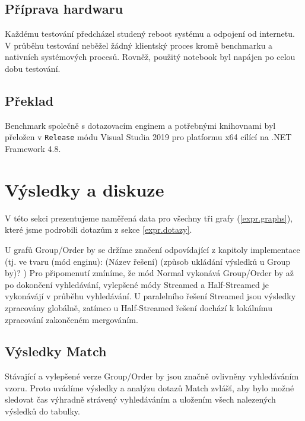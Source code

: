 \subsection{Příprava hardwaru}

Každému testování předcházel studený reboot systému a odpojení od internetu. 
V průběhu testování neběžel žádný klientský proces kromě benchmarku a nativních systémových procesů. 
Rovněž, použitý notebook byl napájen po celou dobu testování.


\subsection{Překlad}

Benchmark společně s dotazovacím enginem a potřebnými knihovnami byl přeložen v \verb+Release+ módu Visual Studia 2019 pro platformu x64 cílící na .NET Framework 4.8. 

\clearpage

\section{Výsledky a diskuze}

V této sekci prezentujeme naměřená data pro všechny tři grafy (\ref{expr.graphs}), které jsme podrobili dotazům z sekce \ref{expr.dotazy}.

U grafů Group/Order by se držíme značení odpovídající z kapitoly implementace (tj. ve tvaru (mód enginu): (Název řešení) (způsob ukládání výsledků u Group by)? )
Pro připomenutí zmíníme, že mód Normal vykonává Group/Order by až po dokončení vyhledávání, vylepšené módy Streamed a Half-Streamed je vykonávájí v průběhu vyhledávání.
U paralelního řešení Streamed jsou výsledky zpracovány globálně, zatímco u Half-Streamed řešení dochází k lokálnímu zpracování zakončeném mergováním.

\subsection{Výsledky Match}
\label{matchResults}

Stávající a vylepšené verze Group/Order by jsou značně ovlivněny vyhledáváním vzoru. 
Proto uvádíme výsledky a analýzu dotazů Match zvlášť, aby bylo možné sledovat čas výhradně strávený vyhledáváním a uložením všech nalezených výsledků do tabulky.

